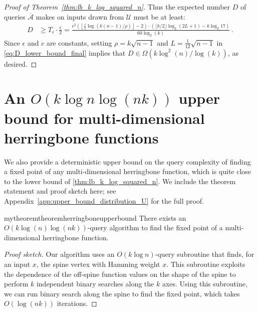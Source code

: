 \documentclass[11pt]{article}
\begin{document}
\begin{proof}[Proof of Theorem~\ref{thm:lb_k_log_squared_n}]
Thus  the expected number $D$ of queries $\overline{\mathcal{A}}$ makes on inputs drawn from $\mathcal{U}$ must be at least:
\begin{align}
    D &\geq T_{\epsilon} \cdot \frac{\epsilon}{2} 
    = \frac{\epsilon^2 \left(\left\lfloor \frac{c}{5} \log(k(n-1) / \rho) \right\rfloor-2\right) \cdot \left(\lfloor k/2 \rfloor \log_2 (2L + 1) - k \log_2{17}\right)}{60 \log_2(k)} \,. \label{eq:D_lower_bound_final}
\end{align}
Since $\epsilon$ and $c$ are constants, setting $\rho = k\sqrt{n-1}$ and $ L = \frac{1}{12} \sqrt{n-1}$ in  \cref{eq:D_lower_bound_final} implies that  $D \in \Omega(k \log^2(n) / \log(k))$, as desired.
\end{proof}






\section{An $O(k \log n \log(nk))$ upper bound for multi-dimensional  herringbone functions} \label{sec:upper_bound_distribution_U}


We also provide a deterministic upper bound on the query complexity of finding a fixed point of any multi-dimensional herringbone function, which is quite close to the lower bound of \cref{thm:lb_k_log_squared_n}. We include the theorem statement and proof sketch here; see Appendix~\ref{app:upper_bound_distribution_U} for the full proof.


\begin{restatable}{mytheorem}{theoremherringboneupperbound}
 \label{thm:herringbone-upper-bound}
    There exists an $O(k \log(n) \log(nk))$-query algorithm to find the fixed point of a multi-dimensional herringbone function.
\end{restatable}
\begin{proof}[Proof sketch]
Our algorithm uses an $O(k \log n)$-query subroutine that finds, for an input $x$, the spine vertex with Hamming weight $x$. This subroutine exploits the dependence of the off-spine function values on the shape of the spine to perform $k$ independent binary searches along the $k$ axes. Using this subroutine, we can run binary search along the spine to find the fixed point, which takes $O(\log (nk))$ iterations.
\end{proof}
\end{document}
